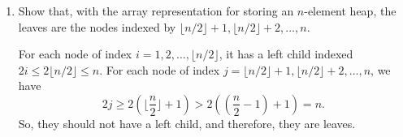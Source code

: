 \documentclass[12pt,reqno]{amsart}
\newif\ifanswer
\begin{document}
\begin{enumerate}[1.]
\item Show that, with the array representation for storing an $n$-element heap, the leaves are the nodes indexed by $\lfloor n/2\rfloor+1, \lfloor n/2\rfloor+2, \dots, n$.

\ifanswer
{}
For each node of index $i = 1, 2, \dots, \lfloor n/2\rfloor$, it has a left child indexed $2i \leq 2\lfloor n/2\rfloor \leq n$. For each node of index $j = \lfloor n/2\rfloor+1, \lfloor n/2\rfloor+2, \dots, n$, we have
$$
2j \geq 2(\lfloor \frac{n}{2}\rfloor + 1) > 2\left((\frac{n}{2} - 1) + 1\right) = n.
$$
So, they should not have a left child, and therefore, they are leaves.
\vspace{1cm}



\end{enumerate}
\end{document}

